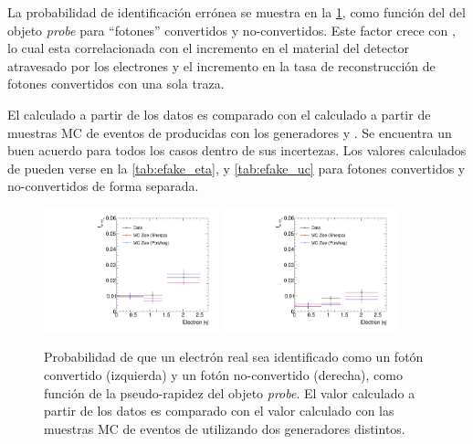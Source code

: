 La probabilidad de identificación errónea se muestra en la \cref{fig:efake_eta},
como función del {\abseta} del objeto \emph{probe} para ``fotones'' convertidos
y no-convertidos. Este factor crece con {\abseta}, lo cual esta correlacionada
con el incremento en el material del detector atravesado por los electrones y el
incremento en la tasa de reconstrucción de fotones convertidos con una sola
traza.

El {\feg} calculado a partir de los datos es comparado con el calculado a partir
de muestras MC de eventos de {\Zee} producidas con los generadores {\sherpa} y
{\powheg}. Se encuentra un buen acuerdo para todos los casos dentro de sus incertezas.
Los valores calculados de {\feg} pueden verse en la \cref{tab:efake_eta}, y \cref{tab:efake_uc} para fotones
convertidos y no-convertidos de forma separada.

\begin{figure}[!htbp]
  \centering

  \includegraphics[width=0.45\textwidth]{figures/fegc_feta}
  \includegraphics[width=0.45\textwidth]{figures/fegu_feta}

  \caption{Probabilidad de que un electrón real sea identificado como un fotón convertido (izquierda)
    y un fotón no-convertido (derecha), como función de la pseudo-rapidez del objeto \emph{probe}. El valor
    calculado a partir de los datos es comparado con el valor calculado con las muestras MC de eventos de {\Zee} utilizando
    dos generadores distintos.}
  \label{fig:efake_eta}
\end{figure}


